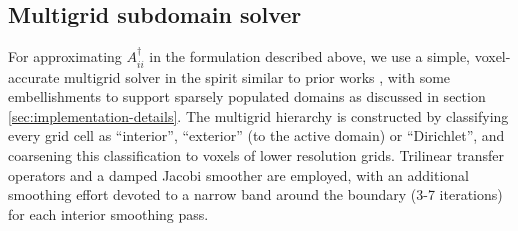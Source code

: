 \subsection{Multigrid subdomain solver}

For approximating $A_{ii}^\dagger$ in the formulation described above, we use a simple, voxel-accurate multigrid solver in the spirit
similar to prior works
\cite{mcadams2010parallel,Molemaker:2008:LowViscosityFlow},
with some embellishments to support sparsely populated domains as
discussed in section \ref{sec:implementation-details}. The multigrid hierarchy is constructed by classifying every grid
cell as ``interior'', ``exterior'' (to the active domain) or ``Dirichlet'', and coarsening this classification to voxels of lower resolution grids. Trilinear
transfer operators and a damped Jacobi smoother are employed, with an additional
smoothing effort devoted to a narrow band around the boundary (3-7
iterations) for each interior smoothing pass.


